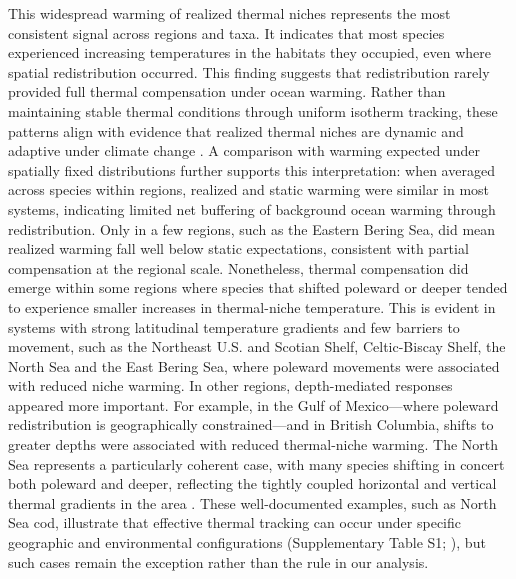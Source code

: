 \documentclass[9pt,twocolumn,twoside]{pnas-new}
\begin{document}
This widespread warming of realized thermal niches represents the most consistent signal across regions and taxa. It indicates that most species experienced increasing temperatures in the habitats they occupied, even where spatial redistribution occurred. This finding suggests that redistribution rarely provided full thermal compensation under ocean warming. Rather than maintaining stable thermal conditions through uniform isotherm tracking, these patterns align with evidence that realized thermal niches are dynamic and adaptive under climate change \citep{fredston_range_2021, ward_win_2024}. A comparison with warming expected under spatially fixed distributions further supports this interpretation: when averaged across species within regions, realized and static warming were similar in most systems, indicating limited net buffering of background ocean warming through redistribution. Only in a few regions, such as the Eastern Bering Sea, did mean realized warming fall well below static expectations, consistent with partial compensation at the regional scale. Nonetheless, thermal compensation did emerge within some regions where species that shifted poleward or deeper tended to experience smaller increases in thermal-niche temperature. This is evident in systems with strong latitudinal temperature gradients and few barriers to movement, such as the Northeast U.S. and Scotian Shelf, Celtic-Biscay Shelf, the North Sea and the East Bering Sea, where poleward movements were associated with reduced niche warming. In other regions, depth-mediated responses appeared more important. For example, in the Gulf of Mexico---where poleward redistribution is geographically constrained---and in British Columbia, shifts to greater depths were associated with reduced thermal-niche warming. The North Sea represents a particularly coherent case, with many species shifting in concert both poleward and deeper, reflecting the tightly coupled horizontal and vertical thermal gradients in the area \citep{ices_atlas_north_sea_1993}. These well-documented examples, such as North Sea cod, illustrate that effective thermal tracking can occur under specific geographic and environmental configurations (Supplementary Table S1; \citealp{perry_climate_2005, engelhard_climate_2014}), but such cases remain the exception rather than the rule in our analysis.
\end{document}
